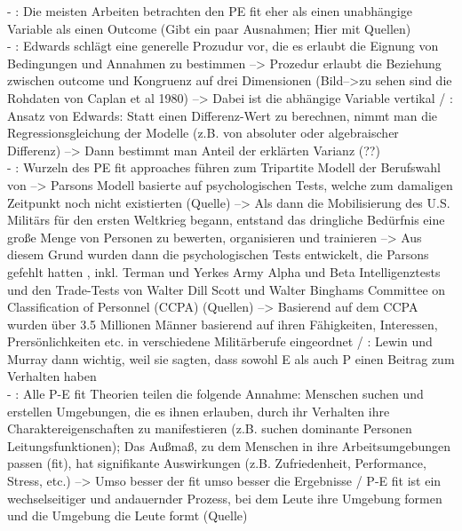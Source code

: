 - \cite[S. 11]{caplan:1993}: Die meisten Arbeiten betrachten den PE fit eher als einen unabhängige Variable als einen Outcome (Gibt ein paar Ausnahmen; Hier mit Quellen) \\
- \cite[S. 15f.]{caplan:1993}: Edwards schlägt eine generelle Prozudur vor, die es erlaubt die Eignung von Bedingungen und Annahmen zu bestimmen --> Prozedur erlaubt die Beziehung zwischen outcome und Kongruenz auf drei Dimensionen (Bild-->zu sehen sind die Rohdaten von Caplan et al 1980) --> Dabei ist die abhängige Variable vertikal / \cite[S. 16]{caplan:1993}: Ansatz von Edwards: Statt einen Differenz-Wert zu berechnen, nimmt man die Regressionsgleichung der Modelle (z.B. von absoluter oder algebraischer Differenz) --> Dann bestimmt man Anteil der erklärten Varianz (??)\\
- \cite[S. 1]{su:2015}: Wurzeln des PE fit approaches führen zum Tripartite Modell der Berufswahl von \textcite{parsons:1909} --> Parsons Modell basierte auf psychologischen Tests, welche zum damaligen Zeitpunkt noch nicht existierten (Quelle) --> Als dann die Mobilisierung des U.S. Militärs für den ersten Weltkrieg begann, entstand das dringliche Bedürfnis eine große Menge von Personen zu bewerten, organisieren und trainieren --> Aus diesem Grund wurden dann die psychologischen Tests entwickelt, die Parsons gefehlt hatten , inkl. Terman und Yerkes Army Alpha und Beta Intelligenztests und den Trade-Tests von Walter Dill Scott und Walter Binghams Committee on Classification of Personnel (CCPA) (Quellen) --> Basierend auf dem CCPA wurden über 3.5 Millionen Männer basierend auf ihren Fähigkeiten, Interessen, Prersönlichkeiten etc. in verschiedene Militärberufe eingeordnet / \cite[S. 2]{su:2015}:  Lewin und Murray dann wichtig, weil sie sagten, dass sowohl E als auch P einen Beitrag zum Verhalten haben \\
- \cite[S. 3]{su:2015}: Alle P-E fit Theorien teilen die folgende Annahme: Menschen suchen und erstellen Umgebungen, die es ihnen erlauben, durch ihr Verhalten ihre Charaktereigenschaften zu manifestieren (z.B. suchen dominante Personen Leitungsfunktionen); Das Außmaß, zu dem Menschen in ihre Arbeitsumgebungen passen (fit), hat signifikante Auswirkungen (z.B. Zufriedenheit, Performance, Stress, etc.) --> Umso besser der fit umso besser die Ergebnisse / P-E fit ist ein wechselseitiger und andauernder Prozess, bei dem Leute ihre Umgebung formen und die Umgebung die Leute formt (Quelle) \\
